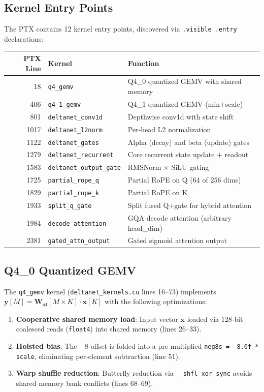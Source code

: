\documentclass[11pt]{article}
\begin{document}
\subsection{Kernel Entry Points}

The PTX contains 12 kernel entry points, discovered via \texttt{.visible .entry}
declarations:

\begin{longtable}{rlp{2.8in}}
\toprule
\textbf{PTX Line} & \textbf{Kernel} & \textbf{Function} \\
\midrule
18 & \texttt{q4\_gemv} & Q4\_0 quantized GEMV with shared memory \\
406 & \texttt{q4\_1\_gemv} & Q4\_1 quantized GEMV (min+scale) \\
801 & \texttt{deltanet\_conv1d} & Depthwise conv1d with state shift \\
1017 & \texttt{deltanet\_l2norm} & Per-head L2 normalization \\
1122 & \texttt{deltanet\_gates} & Alpha (decay) and beta (update) gates \\
1279 & \texttt{deltanet\_recurrent} & Core recurrent state update + readout \\
1583 & \texttt{deltanet\_output\_gate} & RMSNorm $\times$ SiLU gating \\
1725 & \texttt{partial\_rope\_q} & Partial RoPE on Q (64 of 256 dims) \\
1829 & \texttt{partial\_rope\_k} & Partial RoPE on K \\
1933 & \texttt{split\_q\_gate} & Split fused Q+gate for hybrid attention \\
1984 & \texttt{decode\_attention} & GQA decode attention (arbitrary head\_dim) \\
2381 & \texttt{gated\_attn\_output} & Gated sigmoid attention output \\
\bottomrule
\end{longtable}

\subsection{Q4\_0 Quantized GEMV}

The \texttt{q4\_gemv} kernel (\texttt{deltanet\_kernels.cu} lines 16--73)
implements $\mathbf{y}[M] = \mathbf{W}_{q4}[M \times K] \cdot \mathbf{x}[K]$
with the following optimizations:

\begin{enumerate}
  \item \textbf{Cooperative shared memory load}: Input vector $\mathbf{x}$ loaded via
        128-bit coalesced reads (\texttt{float4}) into shared memory (lines 26--33).
  \item \textbf{Hoisted bias}: The $-8$ offset is folded into a pre-multiplied
        \texttt{neg8s = -8.0f * scale}, eliminating per-element subtraction (line 51).
  \item \textbf{Warp shuffle reduction}: Butterfly reduction via
        \texttt{\_\_shfl\_xor\_sync} avoids shared memory bank conflicts (lines 68--69).
\end{enumerate}
\end{document}
